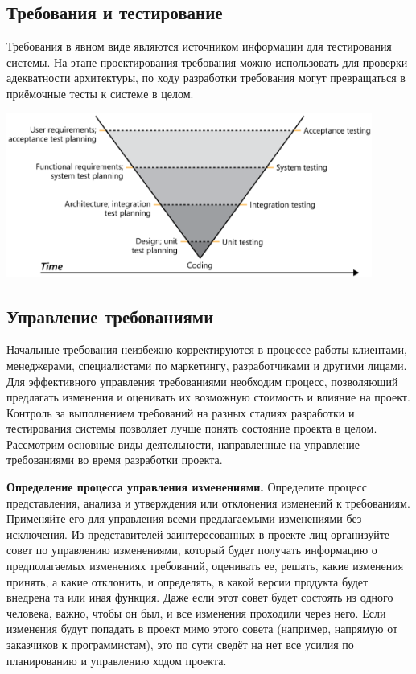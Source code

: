 \documentclass{../../text-style}
\begin{document}
\subsection{Требования и тестирование}

Требования в явном виде являются источником информации для тестирования системы.
На этапе проектирования требования можно использовать для проверки адекватности архитектуры, по ходу разработки требования могут превращаться в приёмочные тесты к системе в целом.

\begin{center}
    \includegraphics[width=0.9\textwidth]{requirementsAndTesting.png}
\end{center}

\subsection{Управление требованиями}

Начальные требования неизбежно корректируются в процессе работы клиентами, менеджерами, специалистами по маркетингу, разработчиками и другими лицами.
Для эффективного управления требованиями необходим процесс, позволяющий предлагать изменения и оценивать их возможную стоимость и влияние на проект.
Контроль за выполнением требований на разных стадиях разработки и тестирования системы позволяет лучше понять состояние проекта в целом.
Рассмотрим основные виды деятельности, направленные на управление требованиями во время разработки проекта.

\textbf{Определение процесса управления изменениями.}
Определите процесс представления, анализа и утверждения или отклонения изменений к требованиям.
Применяйте его для управления всеми предлагаемыми изменениями без исключения.
Из представителей заинтересованных в проекте лиц организуйте совет по управлению изменениями, который будет получать информацию о предполагаемых изменениях требований, оценивать ее, решать, какие изменения принять, а какие отклонить, и определять, в какой версии продукта будет внедрена та или иная функция.
Даже если этот совет будет состоять из одного человека, важно, чтобы он был, и все изменения проходили через него.
Если изменения будут попадать в проект мимо этого совета (например, напрямую от заказчиков к программистам), это по сути сведёт на нет все усилия по планированию и управлению ходом проекта.
\end{document}
